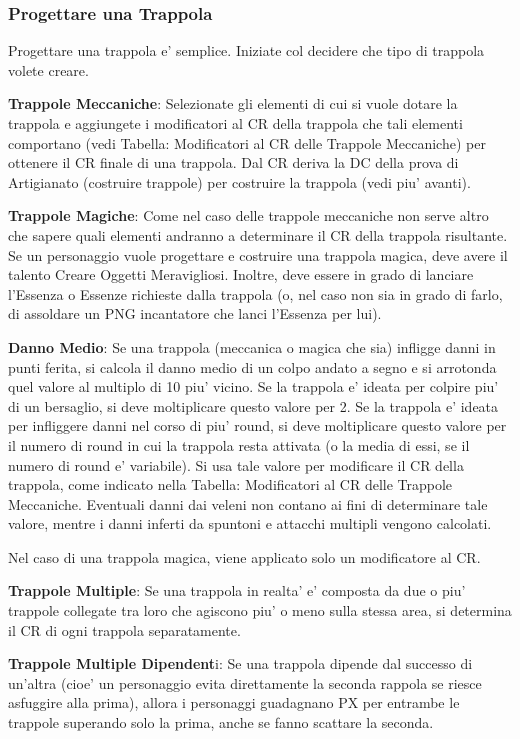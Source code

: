 \documentclass[a4paper,11pt,twoside,openany]{book}
\begin{document}
{		\subsubsection{Progettare una Trappola}
		
		Progettare una trappola e' semplice. Iniziate col decidere che tipo di trappola volete creare.
		
		\textbf{Trappole Meccaniche}: Selezionate gli elementi di cui si vuole dotare la trappola e aggiungete i modificatori al CR della trappola che tali elementi comportano (vedi Tabella: Modificatori al CR delle Trappole Meccaniche) per ottenere il CR finale di una trappola. Dal CR deriva la DC della prova di Artigianato (costruire trappole) per costruire la trappola (vedi piu' avanti).
		
		\textbf{Trappole Magiche}: Come nel caso delle trappole meccaniche non serve altro che sapere quali elementi andranno a determinare il CR della trappola risultante. Se un personaggio vuole progettare e costruire una trappola magica, deve avere il talento Creare Oggetti Meravigliosi. Inoltre, deve essere in grado di lanciare l'Essenza o Essenze richieste dalla trappola (o, nel caso non sia in grado di farlo, di assoldare un PNG incantatore che lanci l'Essenza per lui).
		
		\textbf{Danno Medio}: Se una trappola (meccanica o magica che sia) infligge danni in punti ferita, si calcola il danno medio di un colpo andato a segno e si arrotonda quel valore al multiplo di 10 piu' vicino. Se la trappola e' ideata per colpire piu' di un bersaglio, si deve moltiplicare questo valore per 2. Se la trappola e' ideata per infliggere danni nel corso di piu' round, si deve moltiplicare questo valore per il numero di round in cui la trappola resta attivata (o la media di essi, se il numero di round e' variabile). Si usa tale valore per modificare il CR della trappola, come indicato nella Tabella: Modificatori al CR delle Trappole Meccaniche. Eventuali danni dai veleni non contano ai fini di determinare tale valore, mentre i danni inferti da spuntoni e attacchi multipli vengono calcolati.
		
		Nel caso di una trappola magica, viene applicato solo un modificatore al CR.
		
		\textbf{Trappole Multiple}: Se una trappola in realta' e' composta da due o piu' trappole collegate tra loro che agiscono piu' o meno sulla stessa area, si determina il CR di ogni trappola separatamente.
		
		\textbf{Trappole Multiple Dipendent}i: Se una trappola dipende dal successo di un'altra (cioe' un personaggio evita direttamente la seconda rappola se riesce asfuggire alla prima), allora i personaggi guadagnano PX per entrambe le trappole superando solo la prima, anche se fanno scattare la seconda.
		
}
\end{document}
